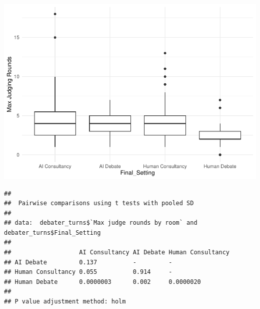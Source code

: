 \documentclass[
]{article}
\newenvironment{Shaded}{\begin{snugshade}}{\end{snugshade}}
\newcommand{\AttributeTok}[1]{\textcolor[rgb]{0.13,0.29,0.53}{#1}}
\newcommand{\FunctionTok}[1]{\textcolor[rgb]{0.13,0.29,0.53}{\textbf{#1}}}
\newcommand{\NormalTok}[1]{#1}
\newcommand{\SpecialCharTok}[1]{\textcolor[rgb]{0.81,0.36,0.00}{\textbf{#1}}}
\newcommand{\StringTok}[1]{\textcolor[rgb]{0.31,0.60,0.02}{#1}}
\begin{document}
\includegraphics[width=1\linewidth]{debate-2309_files/figure-latex/rounds graph-1}

\begin{Shaded}
\end{Shaded}

\begin{verbatim}
## 
##  Pairwise comparisons using t tests with pooled SD 
## 
## data:  debater_turns$`Max judge rounds by room` and debater_turns$Final_Setting 
## 
##                   AI Consultancy AI Debate Human Consultancy
## AI Debate         0.137          -         -                
## Human Consultancy 0.055          0.914     -                
## Human Debate      0.0000003      0.002     0.0000020        
## 
## P value adjustment method: holm
\end{verbatim}
\end{document}
